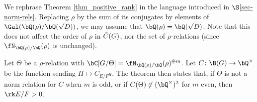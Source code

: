 \begin{rem}\label{rephrase-thm}
    We rephrase Theorem \ref{thm_positive_rank} in the language introduced in $\S$\ref{sec-norm-rels}. 
    Replacing $\rho$ by the sum of its conjugates by elements of $ \Gal(\bQ(\rho) / \bQ(\sqrt{D}))$, we may assume that $\bQ(\rho) = \bQ(\sqrt{D})$. Note that this does not affect the order of $\rho$ in $\hat{C}(G)$, nor the set of $\rho$-relations (since $\repnorm{\rho}$ is unchanged). 
    
    Let $\Theta$ be a $\rho$-relation with $\bC[G / \Theta] = \repnorm{\rho}^{\oplus m}$. Let $C \colon \B(G) \to \bQ^{\times}$ be the function sending $H \mapsto C_{E / F^H}$. The theorem then states that, if $\Theta$ is not a norm relation for $C$ when $m$ is odd, or if $C(\Theta) \not\in (\bQ^{\times})^2$ for $m$ even, then $ \rk E / F > 0$. 
\end{rem}